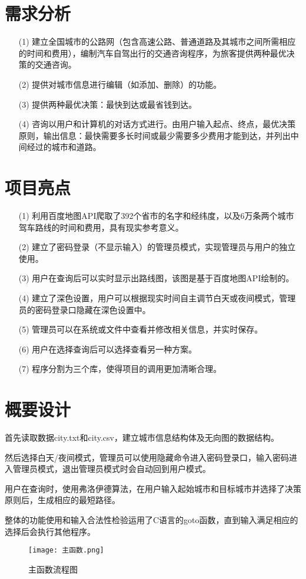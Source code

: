 \documentclass{DateStructure}
\begin{document}
\makecover
\newpage
\thispagestyle{empty}
\tableofcontents   
\newpage
\setcounter{page}{1}  

\section{需求分析}
\begin{itemize}
\item[(1)]建立全国城市的公路网（包含高速公路、普通道路及其城市之间所需相应的时间和费用），编制汽车自驾出行的交通咨询程序，为旅客提供两种最优决策的交通咨询。
\item[(2)]提供对城市信息进行编辑（如添加、删除）的功能。
\item[(3)]提供两种最优决策：最快到达或最省钱到达。
\item[(4)]咨询以用户和计算机的对话方式进行。由用户输入起点、终点，最优决策原则，输出信息：最快需要多长时间或最少需要多少费用才能到达，并列出中间经过的城市和道路。
\end{itemize}

\section{项目亮点}
\begin{itemize}
\item[(1)]利用百度地图API爬取了392个省市的名字和经纬度，以及6万条两个城市驾车路线的时间和费用，具有现实参考意义。
\item[(2)]建立了密码登录（不显示输入）的管理员模式，实现管理员与用户的独立使用。
\item[(3)]用户在查询后可以实时显示出路线图，该图是基于百度地图API绘制的。
\item[(4)]建立了深色设置，用户可以根据现实时间自主调节白天或夜间模式，管理员的密码登录口隐藏在深色设置中。
\item[(5)]管理员可以在系统或文件中查看并修改相关信息，并实时保存。
\item[(6)]用户在选择查询后可以选择查看另一种方案。
\item[(7)]程序分割为三个库，使得项目的调用更加清晰合理。
\end{itemize}
\section{概要设计}
首先读取数据city.txt和city.csv，建立城市信息结构体及无向图的数据结构。\par
然后选择白天/夜间模式，管理员可以使用隐藏命令进入密码登录口，输入密码进入管理员模式，退出管理员模式时会自动回到用户模式。\par
用户在查询时，使用弗洛伊德算法，在用户输入起始城市和目标城市并选择了决策原则后，生成相应的最短路径。\par
整体的功能使用和输入合法性检验运用了C语言的goto函数，直到输入满足相应的选择后会执行其他程序。
\begin{figure}[H] 
\centering
\texttt{[image: 主函数.png]}
\caption{主函数流程图}
\end{figure}
\end{document}
